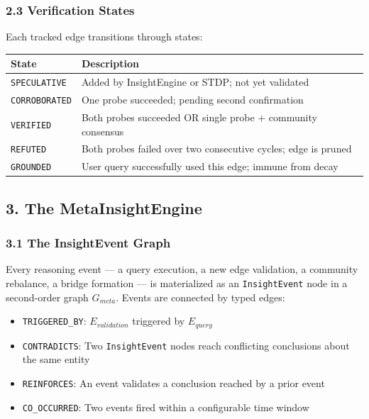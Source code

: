 \subsubsection*{2.3 Verification States}
Each tracked edge transitions through states:

\begin{table}[h]
\small\centering
\begin{tabular}{ll}
\toprule
State & Description \\
\midrule
\texttt{SPECULATIVE} & Added by InsightEngine or STDP; not yet validated \\
\texttt{CORROBORATED} & One probe succeeded; pending second confirmation \\
\texttt{VERIFIED} & Both probes succeeded OR single probe + community consensus \\
\texttt{REFUTED} & Both probes failed over two consecutive cycles; edge is pruned \\
\texttt{GROUNDED} & User query successfully used this edge; immune from decay \\
\bottomrule
\end{tabular}
\end{table}


\subsection*{3. The MetaInsightEngine}

\subsubsection*{3.1 The InsightEvent Graph}
Every reasoning event --- a query execution, a new edge validation, a community rebalance, a bridge formation --- is materialized as an \texttt{InsightEvent} node in a second-order graph $G_{meta}$. Events are connected by typed edges:

\begin{itemize}
  \item \texttt{TRIGGERED\_BY}: $E_{validation}$ triggered by $E_{query}$
  \item \texttt{CONTRADICTS}: Two \texttt{InsightEvent} nodes reach conflicting conclusions about the same entity
  \item \texttt{REINFORCES}: An event validates a conclusion reached by a prior event
  \item \texttt{CO\_OCCURRED}: Two events fired within a configurable time window
\end{itemize}


